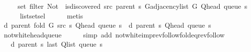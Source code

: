 \begin{isabellebody}
\ \ \ \ \ set\ {\isacharparenleft}{\kern0pt}filter\ {\isacharparenleft}{\kern0pt}Not\ {\isasymcirc}\ is{\isacharunderscore}{\kern0pt}discovered\ src\ {\isacharparenleft}{\kern0pt}parent\ s{\isacharparenright}{\kern0pt}{\isacharparenright}{\kern0pt}\ {\isacharparenleft}{\kern0pt}G{\isachardot}{\kern0pt}adjacency{\isacharunderscore}{\kern0pt}list\ G\ {\isacharparenleft}{\kern0pt}Q{\isacharunderscore}{\kern0pt}head\ {\isacharparenleft}{\kern0pt}queue\ s{\isacharparenright}{\kern0pt}{\isacharparenright}{\kern0pt}{\isacharparenright}{\kern0pt}{\isacharparenright}{\kern0pt}{\isachardoublequoteclose}\isanewline
\ \ \ \ \isamarkupfalse%
\ list{\isachardot}{\kern0pt}set{\isacharunderscore}{\kern0pt}sel{\isacharparenleft}{\kern0pt}{}{\isacharparenright}{\kern0pt}\isanewline
\ \ \ \ \isamarkupfalse%
\ metis\isanewline
\isanewline
\ \ \isamarkupfalse%
\ {\isachardoublequoteopen}d\ {\isacharparenleft}{\kern0pt}parent\ {\isacharparenleft}{\kern0pt}fold\ G\ src\ s{\isacharparenright}{\kern0pt}{\isacharparenright}{\kern0pt}\ {\isacharparenleft}{\kern0pt}Q{\isacharunderscore}{\kern0pt}head\ {\isacharparenleft}{\kern0pt}queue\ s{\isacharparenright}{\kern0pt}{\isacharparenright}{\kern0pt}\ {\isacharequal}{\kern0pt}\ d\ {\isacharparenleft}{\kern0pt}parent\ s{\isacharparenright}{\kern0pt}\ {\isacharparenleft}{\kern0pt}Q{\isacharunderscore}{\kern0pt}head\ {\isacharparenleft}{\kern0pt}queue\ s{\isacharparenright}{\kern0pt}{\isacharparenright}{\kern0pt}{\isachardoublequoteclose}\isanewline
\ \ \ \ \isamarkupfalse%
\ not{\isacharunderscore}{\kern0pt}white{\isacharunderscore}{\kern0pt}head{\isacharunderscore}{\kern0pt}queue\isanewline
\ \ \ \ \isamarkupfalse%
\ {\isacharparenleft}{\kern0pt}simp\ add{\isacharcolon}{\kern0pt}\ not{\isacharunderscore}{\kern0pt}white{\isacharunderscore}{\kern0pt}imp{\isacharunderscore}{\kern0pt}rev{\isacharunderscore}{\kern0pt}follow{\isacharunderscore}{\kern0pt}fold{\isacharunderscore}{\kern0pt}eq{\isacharunderscore}{\kern0pt}rev{\isacharunderscore}{\kern0pt}follow{\isacharparenright}{\kern0pt}\isanewline
\ \ \isamarkupfalse%
\ \isamarkupfalse%
\ {\isachardoublequoteopen}{\isachardot}{\kern0pt}{\isachardot}{\kern0pt}{\isachardot}{\kern0pt}\ {\isasymle}\ d\ {\isacharparenleft}{\kern0pt}parent\ s{\isacharparenright}{\kern0pt}\ {\isacharparenleft}{\kern0pt}last\ {\isacharparenleft}{\kern0pt}Q{\isacharunderscore}{\kern0pt}list\ {\isacharparenleft}{\kern0pt}queue\ s{\isacharparenright}{\kern0pt}{\isacharparenright}{\kern0pt}{\isacharparenright}{\kern0pt}{\isachardoublequoteclose}\isanewline

\end{isabellebody}
